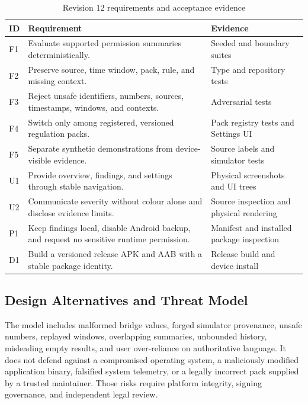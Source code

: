 \begin{table}[H]
\centering
\small
\caption{Revision 12 requirements and acceptance evidence}
\label{tab:r11-requirements}
\begin{tabular}{p{}p{}p{}}
\toprule
ID & Requirement & Evidence \\
\midrule
F1 & Evaluate supported permission summaries deterministically. & Seeded and boundary suites \\
F2 & Preserve source, time window, pack, rule, and missing context. & Type and repository tests \\
F3 & Reject unsafe identifiers, numbers, sources, timestamps, windows, and contexts. & Adversarial tests \\
F4 & Switch only among registered, versioned regulation packs. & Pack registry tests and Settings UI \\
F5 & Separate synthetic demonstrations from device-visible evidence. & Source labels and simulator tests \\
U1 & Provide overview, findings, and settings through stable navigation. & Physical screenshots and UI trees \\
U2 & Communicate severity without colour alone and disclose evidence limits. & Source inspection and physical rendering \\
P1 & Keep findings local, disable Android backup, and request no sensitive runtime permission. & Manifest and installed package inspection \\
D1 & Build a versioned release APK and AAB with a stable package identity. & Release build and device install \\
\bottomrule
\end{tabular}
\end{table}

\subsection{Design Alternatives and Threat Model}

The model includes malformed bridge values, forged simulator provenance, unsafe numbers, replayed windows, overlapping summaries, unbounded history, misleading empty results, and user over-reliance on authoritative language. It does not defend against a compromised operating system, a maliciously modified application binary, falsified system telemetry, or a legally incorrect pack supplied by a trusted maintainer. Those risks require platform integrity, signing governance, and independent legal review.

